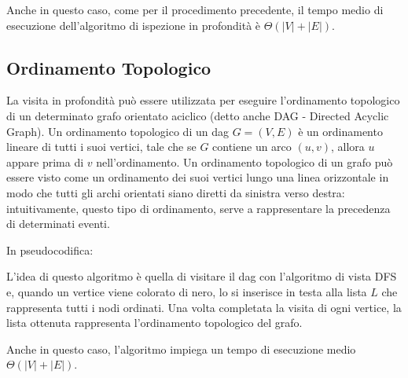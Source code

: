 Anche in questo caso, come per il procedimento precedente, il tempo medio di esecuzione dell'algoritmo di ispezione in profondità è \(\Theta(|V|+|E|)\).

\subsection{Ordinamento Topologico}
La visita in profondità può essere utilizzata per eseguire l'ordinamento  topologico di un determinato grafo orientato aciclico (detto anche DAG - Directed Acyclic Graph). Un ordinamento topologico di un dag \(G=(V,E)\) è un ordinamento lineare di tutti i suoi vertici, tale che se \(G\) contiene un arco \((u,v)\), allora \(u\) appare prima di \(v\) nell'ordinamento. Un ordinamento topologico di un grafo può essere visto come un ordinamento dei suoi vertici lungo una linea orizzontale in modo che tutti gli archi orientati siano diretti da sinistra verso destra: intuitivamente, questo tipo di ordinamento, serve a rappresentare la precedenza di determinati eventi. 

In pseudocodifica:




L'idea di questo algoritmo è quella di visitare il dag con l'algoritmo di vista DFS e, quando un vertice viene colorato di nero, lo si inserisce in testa alla lista \(L\) che rappresenta tutti i nodi ordinati. Una volta completata la visita di ogni vertice, la lista ottenuta rappresenta l'ordinamento topologico del grafo. 

Anche in questo caso, l'algoritmo impiega un tempo di esecuzione medio \(\Theta(|V|+|E|)\).  
